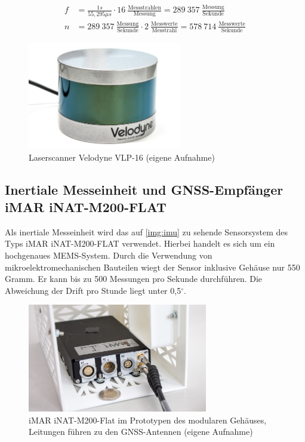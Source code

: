 \documentclass[a4paper,12pt,bibliography=totoc, listof=totoc,titlepage,pointlessnumbers]{scrreprt}
\begin{document}
\begin{equation}
 \label{equ:XproS}
 \begin{aligned}
  f &= \frac{1s}{55,295\mu s} \cdot 16~\frac{\text{Messstrahlen}}{\text{Messung}} = 289~357~\frac{\text{Messung}}{\text{Sekunde}} \\
  n &= 289~357~\frac{\text{Messung}}{\text{Sekunde}} \cdot 2~\frac{\text{Messwerte}}{\text{Messtrahl}} = 578~714~\frac{\text{Messwerte}}{\text{Sekunde}}
 \end{aligned}
\end{equation}

\begin{figure}[!ht]
 \centering
 \includegraphics[width=0.6\textwidth]{./img/vlp16.jpg}
 \caption{Laser\-scan\-ner Velodyne VLP-16 (eigene Aufnahme)}
 \label{img:vlp16}
\end{figure}

\subsection{Inertiale Messeinheit und GNSS-Empfänger iMAR iNAT-M200-FLAT}
\label{s:iMar}
Als inertiale Messeinheit wird das auf \autoref{img:imu} zu sehende Sensorsystem des Typs iMAR iNAT-M200-FLAT verwendet. Hierbei handelt es sich um ein hochgenaues MEMS-System. Durch die Verwendung von mikroelektromechanischen Bauteilen wiegt der Sensor inklusive Gehäuse nur 550 Gramm. Er kann bis zu 500 Messungen pro Sekunde durchführen. Die Abweichung der Drift pro Stunde liegt unter 0,5\(^\circ\). \citep{imar}

\begin{figure}[!ht]
 \centering
 \includegraphics[width=0.7\textwidth]{./img/imu.jpg}
 \caption{iMAR iNAT-M200-Flat im Prototypen des modularen Gehäuses, Leitungen führen zu den GNSS-Antennen (eigene Aufnahme)}
 \label{img:imu}
\end{figure}
\end{document}
